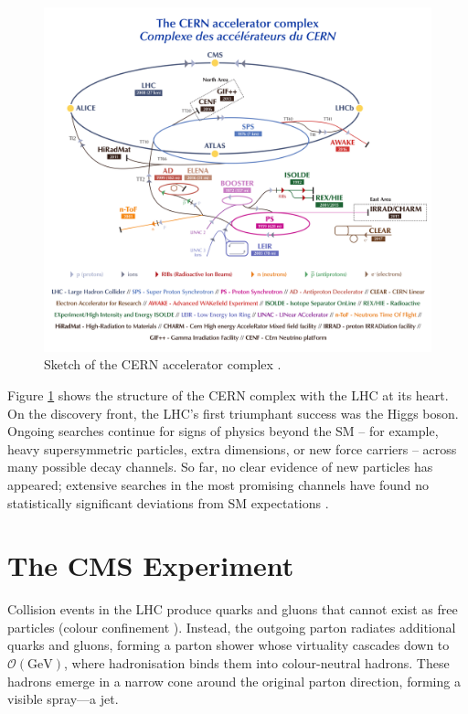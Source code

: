 \begin{figure}[h]
    \centering
    \includegraphics[width=0.9\linewidth]{media/CCC-v2018-print-v2.pdf}
    \caption{ Sketch of the CERN accelerator complex \cite{Mobs:2636343}.}
    \label{fig:lhc}
\end{figure}

Figure \ref{fig:lhc} shows the structure of the CERN complex with the LHC at its heart. On the discovery front, the LHC’s first triumphant success was the Higgs boson. Ongoing searches continue for signs of physics beyond the SM – for example, heavy supersymmetric particles, extra dimensions, or new force carriers – across many possible decay channels. So far, no clear evidence of new particles has appeared; extensive searches in the most promising channels have found no statistically significant deviations from SM expectations \cite{sonneveld2025susyhighlightscurrentresults}.

\section{The CMS Experiment}

Collision events in the LHC produce quarks and gluons that cannot exist as free particles (colour confinement \cite{pich2012standardmodelelectroweakinteractions}). Instead, the outgoing parton radiates additional quarks and gluons, forming a parton shower whose virtuality cascades down to $\mathcal{O}(\mathrm{GeV})$, where hadronisation binds them into colour-neutral hadrons. These hadrons emerge in a narrow cone around the original parton direction, forming a visible spray—a jet. 

